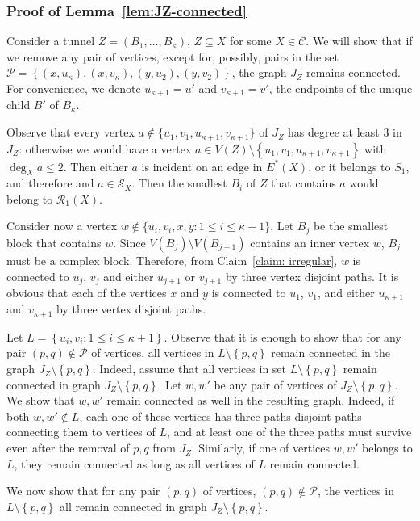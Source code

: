 \documentclass[twoside,leqno,twocolumn]{article}
\newcommand{\set}[1]{\left\{ #1 \right\}}
\newcommand{\sse}{\subseteq}
\newcommand{\pset}{{\mathcal{P}}}
\newcommand{\cset}{{\mathcal{C}}}
\newcommand{\rset}{{\mathcal{R}}}
\newcommand{\sset}{{\mathcal{S}}}
\begin{document}
\iffull
\subsubsection*{Proof of Lemma~\ref{lem:JZ-connected}}

Consider a tunnel $Z=(B_1,\ldots,B_{\kappa})$, $Z\sse X$ for some $X\in\cset$.
We will show that if we remove any pair of vertices, except for, possibly, pairs in the set
$\pset=\set{(x,u_{\kappa}),(x,v_{\kappa}),(y,u_2),(y,v_2)}$, the graph $J_Z$ remains connected.
For convenience, we denote $u_{\kappa+1} = u'$ and $v_{\kappa+1} =v'$, the endpoints of the unique child $B'$ of $B_{\kappa}$.

Observe that every vertex $a \notin \{u_1, v_1, u_{\kappa+1}, v_{\kappa+1}\}$ of $J_Z$ has degree
at least $3$ in $J_Z$: otherwise we would have a vertex $a\in V(Z)\setminus\set{u_1,v_1,u_{\kappa+1},v_{\kappa+1}}$ with $\deg_{X} a \leq 2$. Then either $a$ is incident on an edge in $E^*(X)$, or it belongs to $S_1$, and therefore
and $a\in \sset_X$. Then the smallest $B_i$ of $Z$ that contains $a$
would belong to $\rset_1(X)$. 

Consider now a vertex $w\notin \{u_i, v_i, x, y: 1\leq i\leq \kappa+1\}$.  
Let $B_j$ be the smallest block that contains $w$. Since $V(B_j) \setminus V(B_{j+1})$ contains an inner vertex $w$, $B_j$ must be a complex block. Therefore,  from Claim~\ref{claim: irregular}, $w$ is connected to $u_j$, $v_j$ and either $u_{j+1}$
or $v_{j+1}$ by three vertex disjoint paths. It is obvious that each of the 
vertices $x$ and $y$ is connected to $u_1$, $v_1$, and
either $u_{\kappa+1}$ and $v_{\kappa+1}$ by three vertex disjoint paths. 

Let $L=\set{u_i,v_i: 1\leq i\leq \kappa+1}$.
Observe that it is enough to show that for any pair $(p,q)\not\in \pset$ of vertices, all vertices in $L\setminus\set{p,q}$ remain connected in the graph $J_Z\setminus\set{p,q}$. Indeed, assume that all vertices in set $L\setminus\set{p,q}$ remain connected in graph $J_Z\setminus\set{p,q}$. Let $w,w'$ be any pair of vertices of $J_Z\setminus\set{p,q}$. We show that $w,w'$ remain connected as well in the resulting graph. Indeed, if both $w,w'\not\in L$, each one of these vertices has three paths disjoint paths connecting them to vertices of $L$, and at least one of the three paths must survive even after the removal of $p,q$ from $J_Z$. Similarly, if one of vertices $w,w'$ belongs to $L$, they remain connected as long as all vertices of $L$ remain connected.

We now show that for any pair $(p,q)$ of vertices, $(p,q)\not\in \pset$, the vertices in $L\setminus\set{p,q}$ all remain connected in graph $J_Z\setminus\set{p,q}$.
\end{document}

